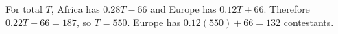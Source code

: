 For total $T$, Africa has $0.28T-66$ and Europe has $0.12T+66$. Therefore $0.22T+66=187$, so $T=550$. Europe has $0.12(550)+66=\boxed{132}$ contestants.
